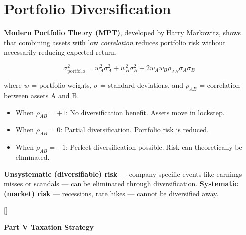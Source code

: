 \documentclass[11pt, letterpaper]{article}
\newcommand{\tealsections}{%
  \titleformat{\section}{\large\bfseries\color{sectionteal}}{}{0em}{}[\color{sectionteal}\titlerule]%
  \titleformat{\subsection}{\normalsize\bfseries\color{sectionteal!80!black}}{}{0em}{}%
}
\newcommand{\partbanner}[3]{%
  \begin{tcolorbox}[colback=#1, colframe=#2, boxrule=1.2pt, arc=4pt,
    left=8pt, right=8pt, top=6pt, bottom=6pt]
    \begin{center}{\LARGE\bfseries #3}\end{center}
  \end{tcolorbox}%
}
\begin{document}
\section*{Portfolio Diversification}

\textbf{Modern Portfolio Theory (MPT)}, developed by Harry Markowitz, shows that combining assets with low \emph{correlation} reduces portfolio risk without necessarily reducing expected return.

\[
  \sigma_{\text{portfolio}}^2 = w_A^2 \sigma_A^2 + w_B^2 \sigma_B^2 + 2 w_A w_B \rho_{AB} \sigma_A \sigma_B
\]

where $w$ = portfolio weights, $\sigma$ = standard deviations, and $\rho_{AB}$ = correlation between assets A and B.

\begin{itemize}[noitemsep]
  \item When $\rho_{AB} = +1$: No diversification benefit. Assets move in lockstep.
  \item When $\rho_{AB} = 0$: Partial diversification. Portfolio risk is reduced.
  \item When $\rho_{AB} = -1$: Perfect diversification possible. Risk can theoretically be eliminated.
\end{itemize}

\textbf{Unsystematic (diversifiable) risk} --- company-specific events like earnings misses or scandals --- can be eliminated through diversification. \textbf{Systematic (market) risk} --- recessions, rate hikes --- cannot be diversified away.

\newpage

\tealsections
{}
\partbanner{part5bg}{sectionteal}{Part V \quad Taxation Strategy}

\vspace{8pt}

\end{document}
